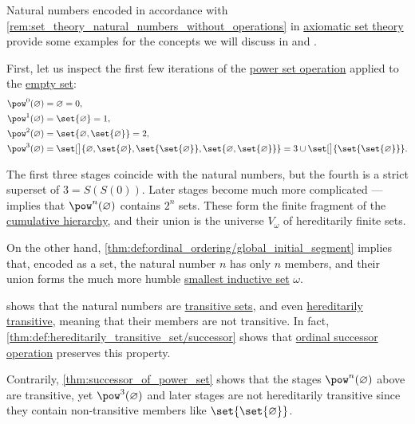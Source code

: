 \begin{example}\label{ex:set_encoding_of_natural_numbers}
  Natural numbers encoded in accordance with \cref{rem:set_theory_natural_numbers_without_operations} in \hyperref[def:axiomatic_set_theory]{axiomatic set theory} provide some examples for the concepts we will discuss in  and .

  First, let us inspect the first few iterations of the \hyperref[def:power_set]{power set operation} applied to the \hyperref[def:empty_set]{empty set}:
  \begin{align*}
    \pow^0(\varnothing) &= \varnothing = 0, \\
    \pow^1(\varnothing) &= \set{ \varnothing } = 1, \\
    \pow^2(\varnothing) &= \set{ \varnothing, \set{ \varnothing } } = 2, \\
    \pow^3(\varnothing) &= \set[\big]{ \varnothing, \set{ \varnothing }, \set{ \set{ \varnothing } }, \set{ \varnothing, \set{ \varnothing } } } = 3 \cup \set[\big] { \set{ \set{ \varnothing } } }.
  \end{align*}

  The first three stages coincide with the natural numbers, but the fourth is a strict superset of \( 3 = S(S(0)) \). Later stages become much more complicated ---  implies that \( \pow^n(\varnothing) \) contains \( 2^n \) sets. These form the finite fragment of the \hyperref[def:cumulative_hierarchy]{cumulative hierarchy}, and their union is the universe \hyperref[def:universe_of_hereditary_finite_sets]{\( V_\omega \)} of hereditarily finite sets.

  On the other hand, \cref{thm:def:ordinal_ordering/global_initial_segment} implies that, encoded as a set, the natural number \( n \) has only \( n \) members, and their union forms the much more humble \hyperref[def:smallest_inductive_set]{smallest inductive set} \( \omega \).

   shows that the natural numbers are \hyperref[def:transitive_set]{transitive sets}, and even \hyperref[def:hereditarily_transitive_set]{hereditarily transitive}, meaning that their members are not transitive. In fact, \cref{thm:def:hereditarily_transitive_set/successor} shows that \hyperref[def:ordinal_successor]{ordinal successor operation} preserves this property.

  Contrarily, \cref{thm:successor_of_power_set} shows that the stages \( \pow^n(\varnothing) \) above are transitive, yet \( \pow^3(\varnothing) \) and later stages are not hereditarily transitive since they contain non-transitive members like \( \set{ \set{ \varnothing } } \).
\end{example}
